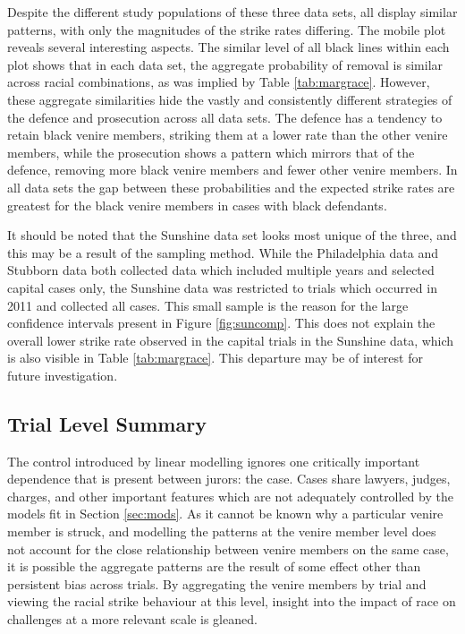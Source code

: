 \documentclass[12pt]{article}
\begin{document}
Despite the different study populations of these three data sets, all display similar patterns, with only the magnitudes of the strike rates differing. The mobile plot reveals several interesting aspects. The similar level of all black lines within each plot shows that in each data set, the aggregate probability of removal is similar across racial combinations, as was implied by Table \ref{tab:margrace}. However, these aggregate similarities hide the vastly and consistently different strategies of the defence and prosecution across all data sets. The defence has a tendency to retain black venire members, striking them at a lower rate than the other venire members, while the prosecution shows a pattern which mirrors that of the defence, removing more black venire members and fewer other venire members. In all data sets the gap between these probabilities and the expected strike rates are greatest for the black venire members in cases with black defendants.

It should be noted that the Sunshine data set looks most unique of the three, and this may be a result of the sampling method. While the Philadelphia data and Stubborn data both collected data which included multiple years and selected capital cases only, the Sunshine data was restricted to trials which occurred in 2011 and collected all cases. This small sample is the reason for the large confidence intervals present in Figure \ref{fig:suncomp}. This does not explain the overall lower strike rate observed in the capital trials in the Sunshine data, which is also visible in Table \ref{tab:margrace}. This departure may be of interest for future investigation.

\subsection{Trial Level Summary} \label{sec:casesum}

The control introduced by linear modelling ignores one critically important dependence that is present between jurors: the case. Cases share lawyers, judges, charges, and other important features which are not adequately controlled by the models fit in Section \ref{sec:mods}.  As it cannot be known why a particular venire member is struck, and modelling the patterns at the venire member level does not account for the close relationship between venire members on the same case, it is possible the aggregate patterns are the result of some effect other than persistent bias across trials. By aggregating the venire members by trial and viewing the racial strike behaviour at this level, insight into the impact of race on challenges at a more relevant scale is gleaned.
\end{document}
